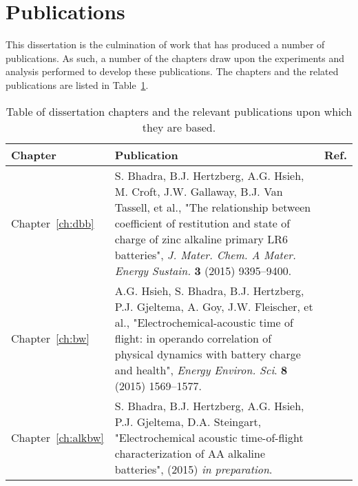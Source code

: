 \section{Publications}
\label{sec:intro:publications}

This dissertation is the culmination of work that has produced a number of publications. As such, a number of the chapters draw upon the experiments and analysis performed to develop  these publications. The chapters and the related publications are listed in Table~\ref{tab:pubtable}.

\begin{table}[htb]
  \caption[List of chapters and associated publications]{\label{tab:pubtable}Table of dissertation chapters and the relevant publications upon which they are based.}
  \begin{tabular}{l p{11 cm} l}
    \hline
    \textbf{Chapter} & \textbf{Publication} & \textbf{Ref.}\\
    \hline
        Chapter~\ref{ch:dbb} & S. Bhadra, B.J. Hertzberg, A.G. Hsieh, M. Croft, J.W. Gallaway, B.J. Van Tassell, et al., "The relationship between coefficient of restitution and state of charge of zinc alkaline primary LR6 batteries", \textit{J. Mater. Chem. A Mater. Energy Sustain.} \textbf{3} (2015) 9395--9400. & \cite{Bhadra2015-aq} \\
        Chapter~\ref{ch:bw} & A.G. Hsieh, S. Bhadra, B.J. Hertzberg, P.J. Gjeltema, A. Goy, J.W. Fleischer, et al., "Electrochemical-acoustic time of flight: in operando correlation of physical dynamics with battery charge and health", \textit{Energy Environ. Sci}. \textbf{8} (2015) 1569--1577. & \cite{Hsieh2015-kr} \\
        Chapter~\ref{ch:alkbw} & S. Bhadra, B.J. Hertzberg, A.G. Hsieh, P.J. Gjeltema, D.A. Steingart, "Electrochemical acoustic time-of-flight characterization of AA alkaline batteries", (2015) \textit{in preparation}. & \cite{Bhadra2015-ey}\\
  \end{tabular}
 
\end{table}












